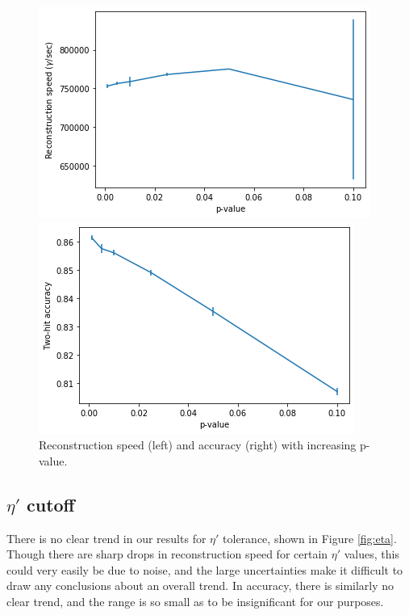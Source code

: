 \begin{figure}
    \centering
    \begin{minipage}{0.49\textwidth} \centering
        \includegraphics[width=\textwidth]{graphs/pi_p_speed.png}
        \end{minipage}
        \begin{minipage}{0.49\textwidth} \centering
        \includegraphics[width=\textwidth]{graphs/pi_p_acc.png}
        \end{minipage}
        \caption{Reconstruction speed (left) and accuracy (right) with increasing p-value.}
        \label{fig:p_val}
\end{figure}

\subsection*{$\eta'$ cutoff}
There is no clear trend in our results for $\eta'$ tolerance, shown in Figure \ref{fig:eta}. Though there are sharp drops in reconstruction speed for certain $\eta'$ values, this could very easily be due to noise, and the large uncertainties make it difficult to draw any conclusions about an overall trend. In accuracy, there is similarly no clear trend, and the range is so small as to be insignificant for our purposes.


